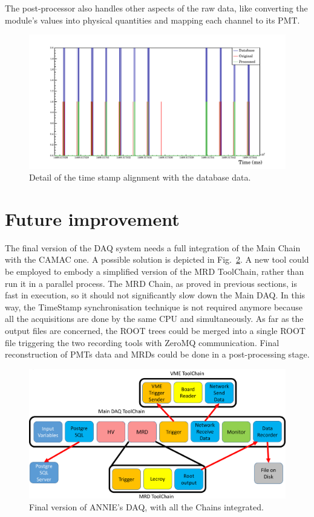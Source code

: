  The post-processor also handles other aspects of the raw data, like converting the module's values %
 into physical quantities and mapping each channel to its PMT.

\begin{figure}
  \centering
  \includegraphics[scale=0.7]{pics/textime.pdf}
  \caption{Detail of the time stamp alignment with the database data.}
  \label{fig:tdcpost}
\end{figure}

\section{Future improvement}
\label{sec:3.3}

 The final version of the DAQ system needs a full integration of the Main Chain with the %
 CAMAC one.
 A possible solution is depicted in Fig.~\ref{fig:daqcomplete}.
 A new tool could be employed to embody a simplified version of the MRD ToolChain, rather than %
 run it in a parallel process.
 The MRD Chain, as proved in previous sections, is fast in execution, so it should not %
 significantly slow down the Main DAQ.
 In this way, the TimeStamp synchronisation technique is not required anymore because all the %
 acquisitions are done by the same CPU and simultaneously.
 As far as the output files are concerned, the ROOT trees could be merged into a single ROOT file %
 triggering the two recording tools with ZeroMQ communication.
 Final reconstruction of PMTs data and MRDs could be done in a post-processing stage.

\begin{figure}[]
  \centering
  \includegraphics[scale=0.17]{pics/pag5richardshkmeeting}
  \caption{Final version of ANNIE's DAQ, with all the Chains integrated.}
  \label{fig:daqcomplete}
\end{figure}

